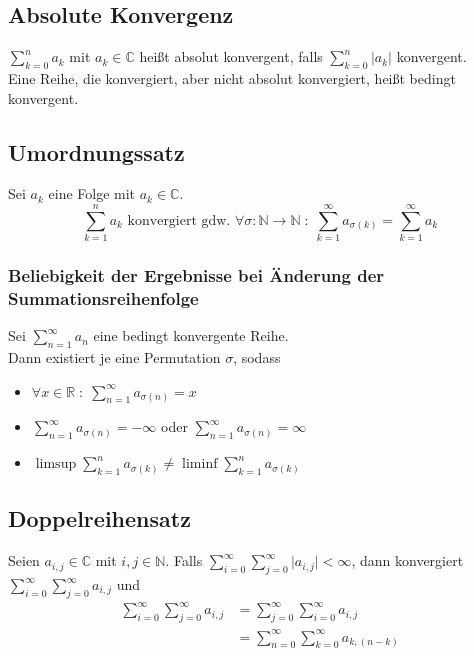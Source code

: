 \documentclass[halfparscip]{scrartcl}
\newcounter{subsection2}
\begin{document}
\subsection{Absolute Konvergenz}
$\sum\limits_{k=0}^na_k$ mit $a_k \in \mathbb{C}$ heißt absolut konvergent, falls $\sum\limits_{k=0}^n\vert a_k\vert$ konvergent.\\
Eine Reihe, die konvergiert, aber nicht absolut konvergiert, heißt bedingt konvergent.

\subsection{Umordnungssatz}
Sei $a_k$ eine Folge mit $a_k \in \mathbb{C}$.
\begin{equation*}
	\sum_{k=1}^na_k \text{ konvergiert gdw. } \forall\sigma: \mathbb{N} \rightarrow \mathbb{N} \;:\; \sum_{k=1}^\infty a_{\sigma(k)} = \sum_{k=1}^\infty a_k
\end{equation*}

\subsubsection*{Beliebigkeit der Ergebnisse bei Änderung der Summationsreihenfolge}
Sei $\sum\limits_{n=1}^{\infty}a_n$ eine bedingt konvergente Reihe.\\
Dann existiert je eine Permutation $\sigma$, sodass
\begin{itemize}
	\item $\forall x \in \mathbb{R} \;:\; \sum\limits_{n=1}^{\infty}a_{\sigma(n)} = x$
	\item $\sum\limits_{n=1}^{\infty}a_{\sigma(n)} = -\infty$ oder $\sum\limits_{n=1}^{\infty}a_{\sigma(n)} = \infty$
	\item $\limsup \sum\limits_{k=1}^{n}a_{\sigma(k)} \neq \liminf \sum\limits_{k=1}^{n}a_{\sigma(k)}$
\end{itemize}
%

\subsection{Doppelreihensatz}
Seien $a_{i,j} \in \mathbb{C}$ mit $i,j \in \mathbb{N}$. Falls $\sum\limits_{i=0}^{\infty}\sum\limits_{j=0}^\infty\vert a_{i,j}\vert < \infty$, dann konvergiert $\sum\limits_{i=0}^{\infty}\sum\limits_{j=0}^\infty a_{i,j}$ und
\begin{align*}
\sum\limits_{i=0}^{\infty}\sum\limits_{j=0}^\infty a_{i,j} &= \sum\limits_{j=0}^{\infty}\sum\limits_{i=0}^\infty a_{i,j} \\
&= \sum\limits_{n=0}^{\infty}\sum\limits_{k=0}^\infty a_{k,(n-k)}
\end{align*}
\end{document}
